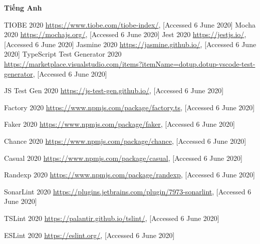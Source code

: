 \textbf{Tiếng Anh}
\begin{thebibliography}{99}
TIOBE 2020
\url{https://www.tiobe.com/tiobe-index/}, [Accessed 6 June 2020]
Mocha 2020
\url{https://mochajs.org/}, [Accessed 6 June 2020]
Jest 2020
\url{https://jestjs.io/}, [Accessed 6 June 2020]
Jasmine 2020
\url{https://jasmine.github.io/}, [Accessed 6 June 2020]
TypeScript Test Generator 2020
\url{https://marketplace.visualstudio.com/items?itemName=dotup.dotup-vscode-test-generator}, [Accessed 6 June 2020]

JS Test Gen 2020
\url{https://js-test-gen.github.io/}, [Accessed 6 June 2020]

Factory 2020
\url{https://www.npmjs.com/package/factory.ts}, [Accessed 6 June 2020]

Faker 2020
\url{https://www.npmjs.com/package/faker}, [Accessed 6 June 2020]

Chance 2020
\url{https://www.npmjs.com/package/chance}, [Accessed 6 June 2020]

Casual 2020
\url{https://www.npmjs.com/package/casual}, [Accessed 6 June 2020]

Randexp 2020
\url{https://www.npmjs.com/package/randexp}, [Accessed 6 June 2020]

SonarLint 2020
\url{https://plugins.jetbrains.com/plugin/7973-sonarlint}, [Accessed 6 June 2020]

TSLint 2020
\url{https://palantir.github.io/tslint/}, [Accessed 6 June 2020]

ESLint 2020
\url{https://eslint.org/}, [Accessed 6 June 2020]


\end{thebibliography}
